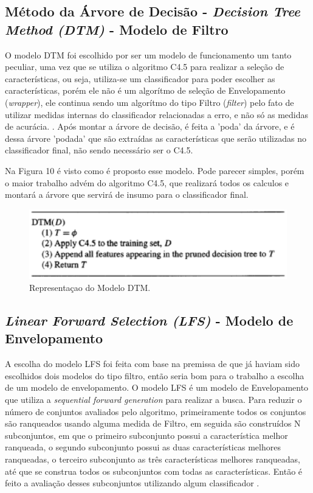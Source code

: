 \subsection{Método da Árvore de Decisão - \textit{Decision Tree Method (DTM)} - Modelo de Filtro}

O modelo DTM foi escolhido por ser um modelo de funcionamento um tanto peculiar, uma vez que se utiliza o algoritmo C4.5 para realizar a seleção de características, ou seja, utiliza-se um classificador para poder escolher as características, porém ele não é um algorítmo de seleção de Envelopamento (\textit{wrapper}), ele continua sendo um algorítmo do tipo Filtro (\textit{filter}) pelo fato de utilizar medidas internas do classificador relacionadas a erro, e não só as medidas de acurácia. \cite{dash_1997}. Após montar a árvore de decisão, é feita a 'poda' da árvore, e é dessa árvore 'podada' que são extraídas as características que serão utilizadas no classificador final, não sendo necessário ser o C4.5. 

Na Figura 10 é visto como é proposto esse modelo. Pode parecer simples, porém o maior trabalho advém do algoritmo C4.5, que realizará todos os calculos e montará a árvore que servirá de insumo para o classificador final.

\begin{figure}[h]
	\centering
	\label{fig12}
		\includegraphics[keepaspectratio=true,scale=0.7]{figuras/fig12.eps}
	\caption{Representaçao do Modelo DTM. \cite{dash_1997}}
\end{figure}

\subsection{\textit{Linear Forward Selection (LFS)} - Modelo de Envelopamento}

A escolha do modelo LFS foi feita com base na premissa de que já haviam sido escolhidos dois modelos do tipo filtro, então seria bom para o trabalho a escolha de um modelo de envelopamento. O modelo LFS é um modelo de Envelopamento que utiliza a \textit{sequential forward generation} para realizar a busca. Para reduzir o número de conjuntos avaliados pelo algoritmo, primeiramente todos os conjuntos são ranqueados usando alguma medida de Filtro, em seguida são construídos N subconjuntos, em que o primeiro subconjunto possui a característica melhor ranqueada, o segundo subconjunto possui as duas características melhores ranqueadas, o terceiro subconjunto as três características melhores ranqueadas, até que se construa todos os subconjuntos com todas as características. Então é feito a avaliação desses subconjuntos utilizando algum classificador \cite{gutlein_2009}.

